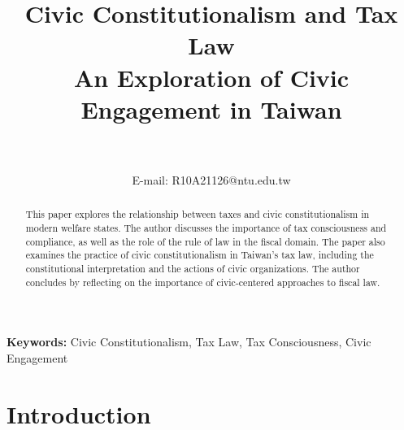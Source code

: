 \documentclass[]{article}
\begin{document}
\title{\vspace{-3em}
Civic Constitutionalism and Tax Law\\
\large An Exploration of Civic Engagement in Taiwan}
\author{\textbf{\fontsize{14pt}{16.4pt}\selectfont{YIFAN WANG}}~\\\normalsize{}~\\{\normalsize\normalfont  E-mail: R10A21126@ntu.edu.tw}}
\def\RunningHead{{Civic Constitutionalism and Tax Law}}

\maketitle 

\vspace{-1em}
\begin{abstract}
  \vspace{-1em}

  This paper explores the relationship between taxes and civic constitutionalism in modern welfare states. The author discusses the importance of tax consciousness and compliance, as well as the role of the rule of law in the fiscal domain. The paper also examines the practice of civic constitutionalism in Taiwan's tax law, including the constitutional interpretation and the actions of civic organizations. The author concludes by reflecting on the importance of civic-centered approaches to fiscal law.

\end{abstract}

\def\keywordstitle{Keywords}

\smallskip\noindent\textbf{Keywords: }{Civic Constitutionalism, Tax Law, Tax Consciousness, Civic Engagement
} 



\setcounter{tocdepth}{2}

\tableofcontents


\pagebreak

\section{Introduction}
\label{sec:intro}
\end{document}
